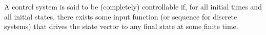\documentclass[12pt]{article}
\begin{document}
A control system is said to be (completely) controllable if, for all initial times  and all initial states, there exists some input function (or sequence for discrete systems) that drives the state vector to any final state  at some finite time.
\end{document}
